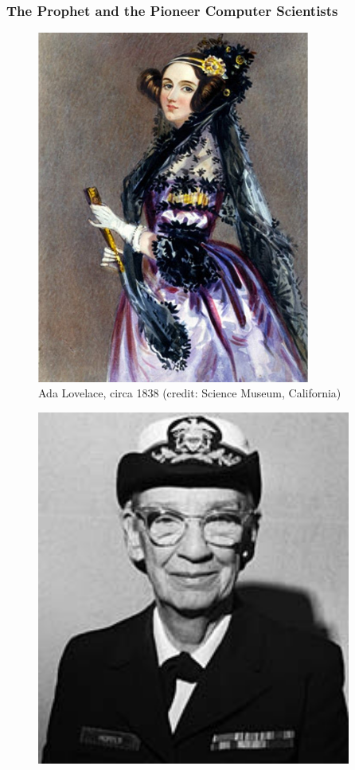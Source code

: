 \documentclass[notes]{beamer}
\begin{document}
\begin{frame}
	\frametitle{The Prophet and the Pioneer Computer Scientists}
	\begin{minipage}[t]{0.49\linewidth}
		\begin{figure}[ht]
			\centering
			\includegraphics[width=0.8\textwidth]{figs/ada-lovelace.jpg}
			\caption*{Ada Lovelace, circa 1838 (credit: Science Museum, California)}
		\end{figure}
	\end{minipage}%
	\hfill%
	\begin{minipage}[t]{0.49\linewidth}
		\begin{figure}[ht]
			\centering
			\includegraphics[width=0.92\textwidth]{figs/grace-hopper.jpg}

\end{figure}
\end{minipage}
\end{frame}
\end{document}
